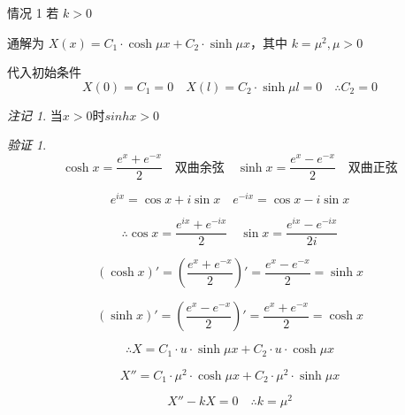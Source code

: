 \documentclass[12pt,a4paper]{article}
\numberwithin{subsection}{section}
\numberwithin{subsubsection}{subsection}
\theoremstyle{plain}
\theoremstyle{definition}
\theoremstyle{remark}
\newtheorem{remark}[theorem]{注记}
\newtheorem{verification}{验证}
\begin{document}
情况 1 \quad 若 \(k > 0\)

通解为 \(X(x) = C_1 \cdot \cosh \mu x + C_2 \cdot \sinh \mu x\)，其中 \(k = \mu^2,\mu>0\)
	
	代入初始条件 
	\begin{equation}
		X(0) = C_1 = 0 \quad X(l) = C_2 \cdot \sinh \mu l = 0 \quad \therefore C_2 = 0
	\end{equation}
	\begin{remark}
	当$x>0$时$sinhx>0$
	\end{remark}
	
	\begin{verification}	
		\begin{equation*}
			\cosh x = \frac{e^x + e^{-x}}{2} \quad \text{双曲余弦} \quad \sinh x = \frac{e^x - e^{-x}}{2} \quad \text{双曲正弦}
		\end{equation*}
		
		\begin{equation*}
			e^{ix} = \cos x + i \sin x \quad e^{-ix} = \cos x - i \sin x
		\end{equation*}
		
		\begin{equation*}
			\therefore \cos x = \frac{e^{ix} + e^{-ix}}{2} \quad \sin x = \frac{e^{ix} - e^{-ix}}{2i}
		\end{equation*}
		
		\begin{equation*}
			(\cosh x)' = \left( \frac{e^x + e^{-x}}{2} \right)' = \frac{e^x - e^{-x}}{2} = \sinh x
		\end{equation*}
		
		\begin{equation*}
			(\sinh x)' = \left( \frac{e^x - e^{-x}}{2} \right)' = \frac{e^x + e^{-x}}{2} = \cosh x
		\end{equation*}
		
		\begin{equation*}
			\therefore X = C_1 \cdot u \cdot \sinh \mu x + C_2 \cdot u \cdot \cosh \mu x
		\end{equation*}
		
		\begin{equation*}
			X'' = C_1 \cdot \mu^2 \cdot \cosh \mu x + C_2 \cdot \mu^2 \cdot \sinh \mu x
		\end{equation*}
		
		\begin{equation*}
			X'' - kX = 0 \quad \therefore k = \mu^2
		\end{equation*}
		
	\end{verification}	
	
\end{document}
